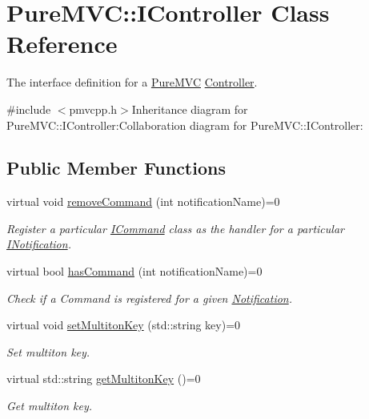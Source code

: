 \hypertarget{class_pure_m_v_c_1_1_i_controller}{
\section{PureMVC::IController Class Reference}
\label{class_pure_m_v_c_1_1_i_controller}
}


The interface definition for a \hyperlink{namespace_pure_m_v_c}{PureMVC} \hyperlink{class_pure_m_v_c_1_1_controller}{Controller}.  


{\ttfamily \#include $<$pmvcpp.h$>$}Inheritance diagram for PureMVC::IController:Collaboration diagram for PureMVC::IController:\subsection*{Public Member Functions}
\begin{DoxyCompactItemize}
\item 
virtual void \hyperlink{class_pure_m_v_c_1_1_i_controller_a5d646a36a3d7fc08a0cefb17662ce8ef}{removeCommand} (int notificationName)=0
\begin{DoxyCompactList}\small\item\em Register a particular {\ttfamily \hyperlink{class_pure_m_v_c_1_1_i_command}{ICommand}} class as the handler for a particular {\ttfamily \hyperlink{class_pure_m_v_c_1_1_i_notification}{INotification}}. \item\end{DoxyCompactList}\item 
virtual bool \hyperlink{class_pure_m_v_c_1_1_i_controller_a0cb56adf2c1300913af0458ba730cbf4}{hasCommand} (int notificationName)=0
\begin{DoxyCompactList}\small\item\em Check if a Command is registered for a given \hyperlink{class_pure_m_v_c_1_1_notification}{Notification}. \item\end{DoxyCompactList}\item 
virtual void \hyperlink{class_pure_m_v_c_1_1_i_multiton_key_heir_a03acb75ab79defba2c28b8de1bbe1ca6}{setMultitonKey} (std::string key)=0
\begin{DoxyCompactList}\small\item\em Set multiton key. \item\end{DoxyCompactList}\item 
virtual std::string \hyperlink{class_pure_m_v_c_1_1_i_multiton_key_heir_aecccfb9898368c6377550ceae5730934}{getMultitonKey} ()=0
\begin{DoxyCompactList}\small\item\em Get multiton key. \item\end{DoxyCompactList}\end{DoxyCompactItemize}


